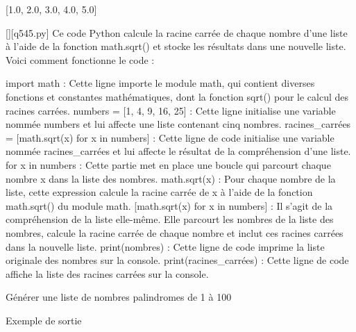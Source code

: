 [1.0, 2.0, 3.0, 4.0, 5.0]
        \par
        \begin{solution}
            \renewcommand{\nomfichier}{q545.py}
            \pythonfile{\chemincode \nomfichier}[][\nomfichier]
            Ce code Python calcule la racine carrée de chaque nombre d'une liste à l'aide de la fonction math.sqrt() et stocke les résultats dans une nouvelle liste. Voici comment fonctionne le code :

    import math : Cette ligne importe le module math, qui contient diverses fonctions et constantes mathématiques, dont la fonction sqrt() pour le calcul des racines carrées.
    numbers = [1, 4, 9, 16, 25] : Cette ligne initialise une variable nommée numbers et lui affecte une liste contenant cinq nombres.
    racines\_carrées = [math.sqrt(x) for x in numbers] : Cette ligne de code initialise une variable nommée racines\_carrées et lui affecte le résultat de la compréhension d'une liste.
        for x in numbers : Cette partie met en place une boucle qui parcourt chaque nombre x dans la liste des nombres.
        math.sqrt(x) : Pour chaque nombre de la liste, cette expression calcule la racine carrée de x à l'aide de la fonction math.sqrt() du module math.
        [math.sqrt(x) for x in numbers] : Il s'agit de la compréhension de la liste elle-même. Elle parcourt les nombres de la liste des nombres, calcule la racine carrée de chaque nombre et inclut ces racines carrées dans la nouvelle liste.
    print(nombres) : Cette ligne de code imprime la liste originale des nombres sur la console.
    print(racines\_carrées) : Cette ligne de code affiche la liste des racines carrées sur la console.
        \end{solution}
        

        \question
        Générer une liste de nombres palindromes de 1 à 100

Exemple de sortie


